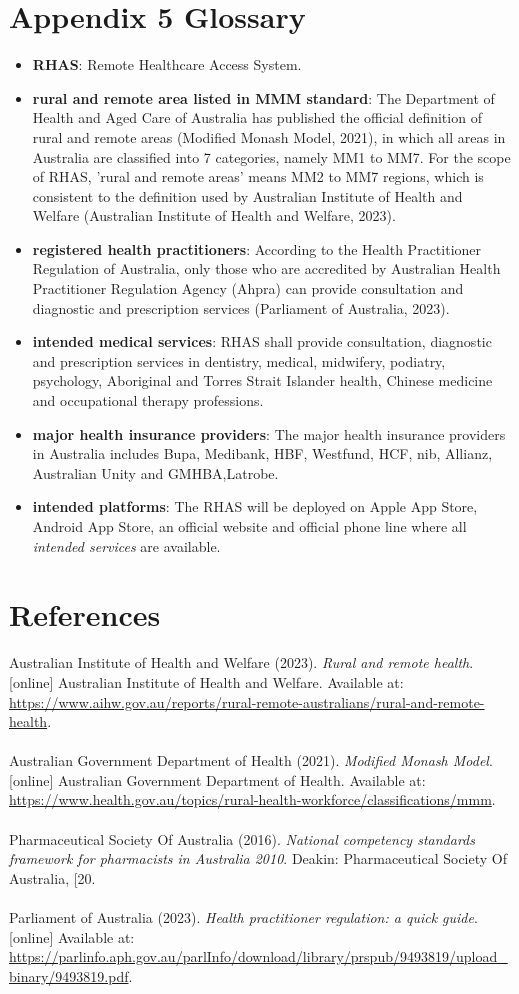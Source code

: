 \documentclass{article}
\begin{document}
\section{Appendix 5 Glossary}
\begin{itemize}
\item \textbf{RHAS}: Remote Healthcare Access System.
\item \textbf{rural and remote area listed in MMM standard}: The Department of Health and Aged Care of Australia has published the official definition of rural and remote areas (Modified Monash Model, 2021), in which all areas in Australia are classified into 7 categories, namely MM1 to MM7. For the scope of RHAS, 'rural and remote areas' means MM2 to MM7 regions, which is consistent to the definition used by Australian Institute of Health and Welfare (Australian Institute of Health and Welfare, 2023). 
\item \textbf{registered health practitioners}: According to the Health Practitioner Regulation of Australia, only those who are accredited by Australian Health Practitioner Regulation Agency (Ahpra) can provide consultation and diagnostic and prescription services (Parliament of Australia, 2023).
\item \textbf{intended medical services}: RHAS shall provide consultation, diagnostic and prescription services in dentistry, medical, midwifery, podiatry, psychology, Aboriginal and Torres Strait Islander health, Chinese medicine and occupational therapy professions.
\item \textbf{major health insurance providers}: The major health insurance providers in Australia includes Bupa, Medibank, HBF, Westfund, HCF, nib, Allianz, Australian Unity and GMHBA,Latrobe.
\item \textbf{intended platforms}: The RHAS will be deployed on Apple App Store, Android App Store, an official website and official phone line where all \textit{intended services} are available.
\end{itemize}
\section{References}
Australian Institute of Health and Welfare (2023). \textit{Rural and remote health}. [online] Australian Institute of Health and Welfare. Available at: \url{https://www.aihw.gov.au/reports/rural-remote-australians/rural-and-remote-health}.\\\\
Australian Government Department of Health (2021). \textit{Modified Monash Model}. [online] Australian Government Department of Health. Available at: \url{https://www.health.gov.au/topics/rural-health-workforce/classifications/mmm}.\\\\
Pharmaceutical Society Of Australia (2016). \textit{National competency standards framework for pharmacists in Australia 2010}. Deakin: Pharmaceutical Society Of Australia, [20.\\\\
Parliament of Australia (2023). \textit{Health practitioner regulation: a quick guide}. [online] Available at: \url{https://parlinfo.aph.gov.au/parlInfo/download/library/prspub/9493819/upload_binary/9493819.pdf}.\\
\end{document}
